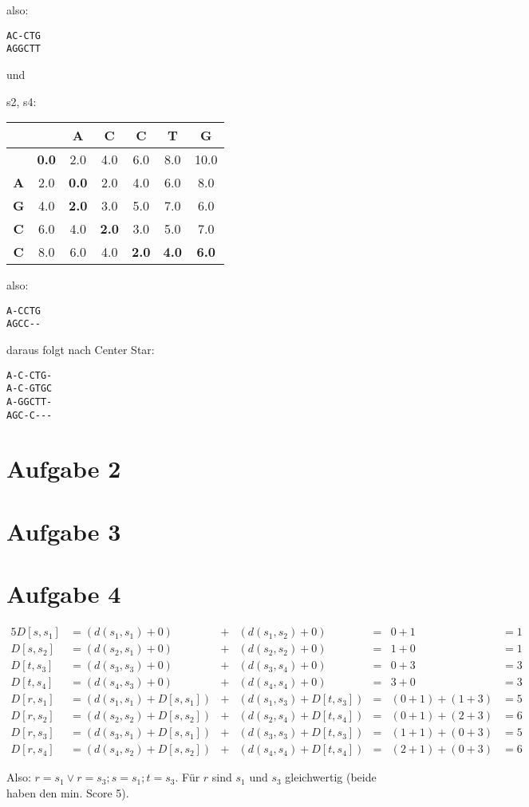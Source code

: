 \documentclass[a4paper,10pt,oneside,leqno]{scrartcl}
\begin{document}
also:
\begin{verbatim}
AC-CTG
AGGCTT
\end{verbatim}

und

s2, s4: \\
\begin{tabular}{c|cccccc}
& \textbf{ } & \textbf{A} & \textbf{C} & \textbf{C} & \textbf{T} & \textbf{G}\\\hline
\textbf{ } & \textbf{0.0} & 2.0 & 4.0 & 6.0 & 8.0 & 10.0\\
\textbf{A} & 2.0 & \textbf{0.0} & 2.0 & 4.0 & 6.0 & 8.0\\
\textbf{G} & 4.0 & \textbf{2.0} & 3.0 & 5.0 & 7.0 & 6.0\\
\textbf{C} & 6.0 & 4.0 & \textbf{2.0} & 3.0 & 5.0 & 7.0\\
\textbf{C} & 8.0 & 6.0 & 4.0 & \textbf{2.0} & \textbf{4.0} & \textbf{6.0}\\
\end{tabular}

also:
\begin{verbatim}
A-CCTG
AGCC--
\end{verbatim}

daraus folgt nach Center Star:

\begin{verbatim}
A-C-CTG-
A-C-GTGC
A-GGCTT-
AGC-C---
\end{verbatim}

\section*{Aufgabe 2}%

\section*{Aufgabe 3}%


\section*{Aufgabe 4}%

\begin{alignat}{5}
 D[s, s_1] &= (d(s_1,s_1)+0) &+{}& (d(s_1,s_2)+0) &=& 0 + 1 &= 1\\
 D[s, s_2] &= (d(s_2,s_1)+0) &+{}& (d(s_2,s_2)+0) &=& 1 + 0 &= 1\\\hline 
 D[t, s_3] &= (d(s_3,s_3)+0) &+{}& (d(s_3,s_4)+0) &=& 0 + 3 &= 3\\
 D[t, s_4] &= (d(s_4,s_3)+0) &+{}& (d(s_4,s_4)+0) &=& 3 + 0 &= 3\\\hline
 D[r, s_1] &= (d(s_1,s_1)+D[s, s_1]) &+{}& (d(s_1,s_3)+D[t, s_3]) &=& (0+1) + (1+3) &= 5\\
 D[r, s_2] &= (d(s_2,s_2)+D[s, s_2]) &+{}& (d(s_2,s_4)+D[t, s_4]) &=& (0+1) + (2+3) &= 6\\
 D[r, s_3] &= (d(s_3,s_1)+D[s, s_1]) &+{}& (d(s_3,s_3)+D[t, s_3]) &=& (1+1) + (0+3) &= 5\\
 D[r, s_4] &= (d(s_4,s_2)+D[s, s_2]) &+{}& (d(s_4,s_4)+D[t, s_4]) &=& (2+1) + (0+3) &= 6
\end{alignat}

Also: $r = s_1 \vee r = s_3 ; s = s_1 ; t = s_3$. Für $r$ sind $s_1$ und $s_3$ gleichwertig (beide haben den min. Score 5).
\end{document}
